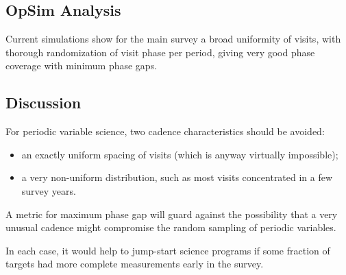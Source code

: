 
\subsection{OpSim Analysis}
\label{sec:keyword:analysis}

Current simulations show for the main survey a broad uniformity of visits, with thorough randomization of visit phase per period, giving very good phase coverage with minimum phase gaps.



\subsection{Discussion}
\label{sec:keyword:discussion}

For periodic variable science, two cadence characteristics should be avoided: 
\begin{itemize} 
\item an exactly uniform spacing of visits (which is anyway virtually impossible); \
\item a very non-uniform distribution, such as most visits concentrated in a few survey years.
 \end{itemize}

A metric for maximum phase gap will guard against the possibility that a very unusual cadence might compromise the random sampling of periodic variables.  

In each case, it would help to jump-start science programs if some fraction of targets had more complete measurements early in the survey. 



